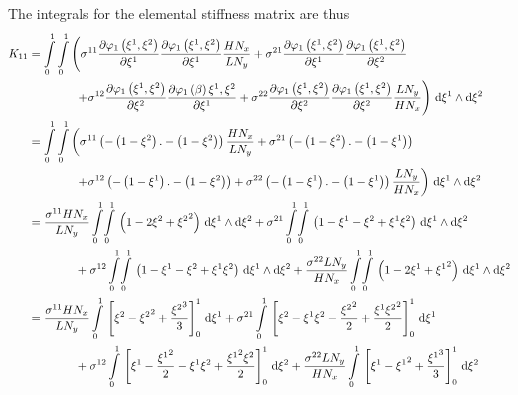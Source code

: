The integrals for the elemental stiffness matrix are thus
\begin{equation}
  \begin{aligned}
    K_{11}&=\dintl{0}{1}\dintl{0}{1}\left(
    \conductivitytensorsymbol^{11}\delby{\lbfn{1}{\xione,\xitwo}}{\xione}
    \delby{\lbfn{1}{\xione,\xitwo}}{\xione}\dfrac{H N_{x}}{L N_{y}}+
    \conductivitytensorsymbol^{21}\delby{\lbfn{1}{\xione,\xitwo}}{\xione}
    \delby{\lbfn{1}{\xione,\xitwo}}{\xitwo}\right.\\
    &\qquad\qquad\left.+\conductivitytensorsymbol^{12}\delby{\lbfn{1}{\xione,\xitwo}}{\xitwo}
    \delby{\lbfn{1}{\beta}{\xione,\xitwo}}{\xione}+
    \conductivitytensorsymbol^{22}\delby{\lbfn{1}{\xione,\xitwo}}{\xitwo}
    \delby{\lbfn{1}{\xione,\xitwo}}{\xitwo}\dfrac{L N_{y}}{H N_{x}}\right)\infinitesimaltwo{\xione}{\xitwo}\\
    &=\dintl{0}{1}\dintl{0}{1}\left(
    \conductivitytensorsymbol^{11}\pbrac{-\pbrac{1-\xitwo}.-\pbrac{1-\xitwo}}\dfrac{H N_{x}}{L N_{y}}+
    \conductivitytensorsymbol^{21}\pbrac{-\pbrac{1-\xitwo}.-\pbrac{1-\xione}}\right.\\
    &\qquad\qquad\left.+\conductivitytensorsymbol^{12}\pbrac{-\pbrac{1-\xione}.-\pbrac{1-\xitwo}}+
    \conductivitytensorsymbol^{22}\pbrac{-\pbrac{1-\xione}.-\pbrac{1-\xione}}\dfrac{L N_{y}}{H N_{x}}\right)
    \infinitesimaltwo{\xione}{\xitwo}\\
    &=\dfrac{\conductivitytensorsymbol^{11} H N_{x}}{L N_{y}}\giint{0}{1}{0}{1}{\pbrac{1-2\xitwo+\xitwosq}}{\xione}{\xitwo}
    +\conductivitytensorsymbol^{21}\giint{0}{1}{0}{1}{\pbrac{1-\xione-\xitwo+\xione\xitwo}}{\xione}{\xitwo}\\
    &\qquad\qquad+\conductivitytensorsymbol^{12}\giint{0}{1}{0}{1}{\pbrac{1-\xione-\xitwo+\xione\xitwo}}{\xione}{\xitwo}
    +\dfrac{\conductivitytensorsymbol^{22} L N_{y}}{H N_{x}}\giint{0}{1}{0}{1}{\pbrac{1-2\xione+\xionesq}}{\xione}{\xitwo} \\
    &=\dfrac{\conductivitytensorsymbol^{11} H N_{x}}{L N_{y}}\gint{0}{1}{\sqbrac{\xitwo-\xitwosq+\dfrac{\xitwocube}{3}}^{1}_{0}}{\xione}
    +\conductivitytensorsymbol^{21}\gint{0}{1}{\sqbrac{\xitwo-\xione\xitwo-\dfrac{\xitwosq}{2}+\dfrac{\xione\xitwosq}{2}}^{1}_{0}}{\xione}\\
    &\qquad\qquad+\conductivitytensorsymbol^{12}\gint{0}{1}{\sqbrac{\xione-\dfrac{\xionesq}{2}-\xione\xitwo+\dfrac{\xionesq\xitwo}{2}}^{1}_{0}}{\xitwo}
    +\dfrac{\conductivitytensorsymbol^{22} L N_{y}}{H N_{x}}\gint{0}{1}{\sqbrac{\xione-\xionesq+\dfrac{\xionecube}{3}}^{1}_{0}}{\xitwo} \\

\end{aligned}
\end{equation}
